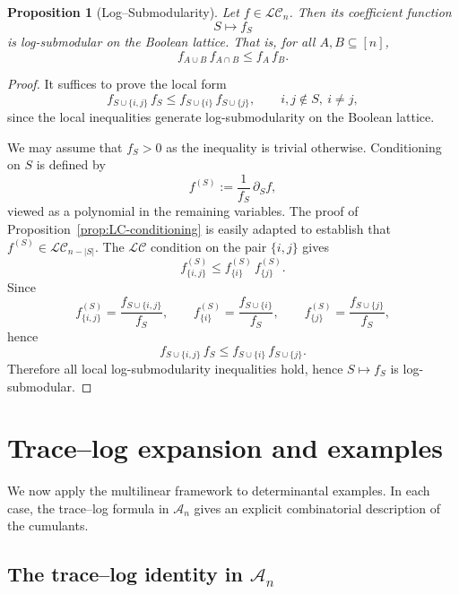 \documentclass[11pt]{amsart}
\newtheorem{prop}[thm]{Proposition}
\theoremstyle{definition}
\begin{document}
\begin{prop}[Log--Submodularity]
\label{prop:LC-log-submodular}
Let \(f\in\mathcal{LC}_n\).  Then its coefficient function
\[
  S\longmapsto f_S
\]
is log-submodular on the Boolean lattice.  That is, for all
\(A,B\subseteq[n]\),
\[
  f_{A\cup B}\, f_{A\cap B} \le f_A\, f_B.
\]
\end{prop}

\begin{proof}
It suffices to prove the local form
\[
  f_{S\cup\{i,j\}}\, f_S
  \le
  f_{S\cup\{i\}}\, f_{S\cup\{j\}},
  \qquad i,j\notin S,\ i\neq j,
\]
since the local inequalities generate log-submodularity on the
Boolean lattice.

We may assume that \(f_S>0\) as the inequality is trivial otherwise.  Conditioning on \(S\) is defined by
\[
  f^{(S)}
  :=
  \frac{1}{f_S}\,\partial_S f,
\]
viewed as a polynomial in the remaining variables. The proof of Proposition~\ref{prop:LC-conditioning} is easily adapted to establish that \(f^{(S)}\in\mathcal{LC}_{n-|S|}\).  The \(\mathcal{LC}\) condition on the pair \(\{i,j\}\) gives
\[
  f^{(S)}_{\{i,j\}}
  \le
  f^{(S)}_{\{i\}}\, f^{(S)}_{\{j\}}.
\]
Since
\[
  f^{(S)}_{\{i,j\}}
  =
  \frac{f_{S\cup\{i,j\}}}{f_S},
  \qquad
  f^{(S)}_{\{i\}}
  =
  \frac{f_{S\cup\{i\}}}{f_S},
  \qquad
  f^{(S)}_{\{j\}}
  =
  \frac{f_{S\cup\{j\}}}{f_S},
\]
hence
\[
  f_{S\cup\{i,j\}}\, f_S
  \le
  f_{S\cup\{i\}}\, f_{S\cup\{j\}}.
\]
Therefore all local log-submodularity inequalities hold, hence \(S\mapsto f_S\) is log-submodular.
\end{proof}










\section{Trace--log expansion and examples}
\label{sec:laplacian}

We now apply the multilinear framework to determinantal examples.  In each case, the trace--log formula in $\mathcal{A}_n$ gives an explicit combinatorial description of the cumulants.

\subsection{The trace--log identity in $\mathcal{A}_n$}
\end{document}
